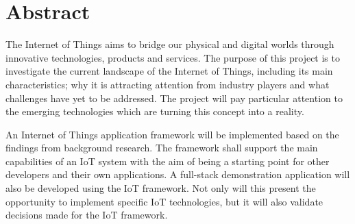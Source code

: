 \chapter{Abstract}
  The Internet of Things aims to bridge our physical and digital worlds through innovative technologies, products and services. The purpose of this project is to investigate the current landscape of the Internet of Things, including its main characteristics; why it is attracting attention from industry players and what challenges have yet to be addressed. The project will pay particular attention to the emerging technologies which are turning this concept into a reality.

  An Internet of Things application framework will be implemented based on the findings from background research. The framework shall support the main capabilities of an IoT system with the aim of being a starting point for other developers and their own applications. A full-stack demonstration application will also be developed using the IoT framework. Not only will this present the opportunity to implement specific IoT technologies, but it will also validate decisions made for the IoT framework.
